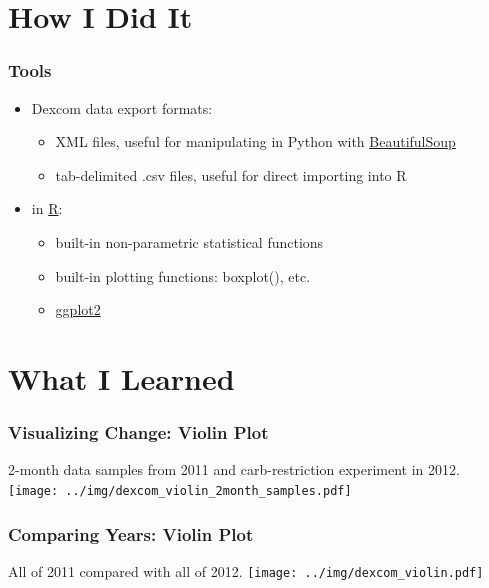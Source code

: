 \documentclass{beamer}
\begin{document}
\section{How I Did It}

\begin{frame}
  \frametitle{Tools}
  
  \begin{itemize}
  \item Dexcom data export formats:
    \begin{itemize}
    \item XML files, useful for manipulating in Python with \href{http://www.crummy.com/software/BeautifulSoup/}{BeautifulSoup}
    \item tab-delimited .csv files, useful for direct importing into R
    \end{itemize}
  \item in \href{http://www.r-project.org/}{R}:
    \begin{itemize}
    \item built-in non-parametric statistical functions
    \item built-in plotting functions: boxplot(), etc.
    \item \href{http://had.co.nz/ggplot2/}{ggplot2}
    \end{itemize}
  \end{itemize}
\end{frame}

\section{What I Learned}

\begin{frame}
  \frametitle{Visualizing Change: Violin Plot}

  \begin{center}
  2-month data samples from 2011 and carb-restriction experiment in 2012.
    \texttt{[image: ../img/dexcom\_violin\_2month\_samples.pdf]}
  \end{center}

\end{frame}

\begin{frame}
  \frametitle{Comparing Years: Violin Plot}

  \begin{center}
  All of 2011 compared with all of 2012.
    \texttt{[image: ../img/dexcom\_violin.pdf]}
  \end{center}

\end{frame}
\end{document}
